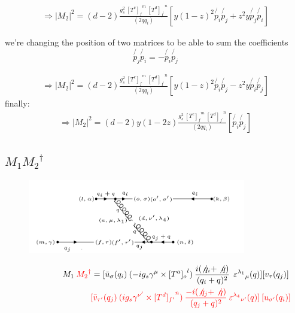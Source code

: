 \begin{equation}
\begin{split}
\Longrightarrow|M_2|^2 =(d-2) \frac{g_s^2 \: {[T^c]_f}^m \: {[T^d]_{f^{\prime}}}^n }{(2qq_i)}
[y(1-z)^2 \not{p_i}\not{p_j}
+z^2y \not{p_j}\not{p_i}]
\end{split}
\end{equation}

we're changing the position of two matrices to be able to sum the coefficients 
\begin{equation}
\not{p_j}\not{p_i} = -\not{p_i}\not{p_j}
\end{equation} 

\begin{equation}
\begin{split}
\Longrightarrow|M_2|^2 =(d-2) \frac{g_s^2 \: {[T^c]_f}^m \: {[T^d]_{f^{\prime}}}^n }{(2qq_i)}
[y(1-z)^2 \not{p_i}\not{p_j}
-z^2y \not{p_i}\not{p_j}]
\end{split}
\end{equation}
finally:
\begin{equation}
\begin{split}
\Longrightarrow|M_2|^2 =(d-2)y(1-2z) \frac{g_s^2 \: {[T^c]_f}^m \: {[T^d]_{f^{\prime}}}^n }{(2qq_i)}
[\not{p_i}\not{p_j}
]
\end{split}
\end{equation}


\newpage

\subsection{$M_1 {M_2}^{\dagger}$}

\begin{figure}[h!]
\centering
\includegraphics[width=0.85\textwidth]{images/M1M2Degaqqg.png}
\end{figure}

\begin{equation}
\begin{split}
M_1\:{\color[RGB]{255,0,0} {M_2}^{\dagger}} = [{\bar{u}}_{\sigma}(q_i)\: (-ig_s \gamma^{\mu}\times {[T^a]_o}^l) \: \frac{i(\not{q_i} + \not{q})}{(q_i + q)^2}\:\: {\varepsilon^{\lambda_1}}_{\mu} (q)] [{v}_{\tau}(q_j)]\: \\
\quad\quad\quad\quad\quad\quad\quad\quad\:\:{\color[RGB]{255,0,0}[\bar{v}_{{\tau}^{\prime}}(q_j) \: (ig_s \gamma^{{\nu}^{\prime}}\times {[T^d]_{f^{\prime}}}^n) \: \frac{-i(\not{q_j} + \not{q})}{(q_j + q)^2} \: {\varepsilon^{\lambda_4}}_{{\nu}^{\prime}} (q)]\: [{u}_{{\sigma}^{\prime}}(q_i)]}
\end{split}
\end{equation}



